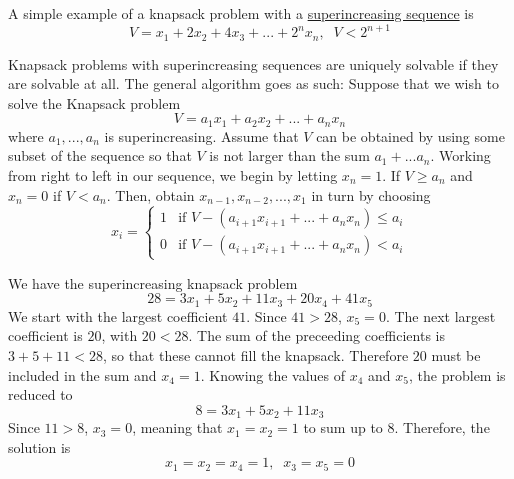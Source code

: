 \documentclass{article}
\newcounter{example}[section]
\begin{document}
A simple example of a knapsack problem with a \hyperref[def:superincreasing-sequence]{superincreasing sequence} is 
\begin{equation}
  V = x_1 + 2x_2 + 4x_3 + ... + 2^n x_n, \;\; V < 2^{n+1}
\end{equation}

Knapsack problems with superincreasing sequences are uniquely solvable if they are solvable at all. The general algorithm goes as such: Suppose that we wish to solve the Knapsack problem 
\begin{equation}
  V = a_1 x_1 + a_2 x_2 + ... + a_n x_n
\end{equation}
where $a_1, ..., a_n$ is superincreasing. Assume that $V$ can be obtained by using some subset of the sequence so that $V$ is not larger than the sum $a_1 + ... a_n$. Working from right to left in our sequence, we begin by letting $x_n = 1$. If $V \geq a_n$ and $x_n = 0$ if $V<a_n$. Then, obtain $x_{n-1}, x_{n-2}, ..., x_1$ in turn by choosing
\begin{equation}
  x_i = \begin{cases}
  1 & \text{if } V - (a_{i+1}x_{i+1} + ... + a_n x_n) \leq a_i \\
  0 & \text{if } V - (a_{i+1}x_{i+1} + ... + a_n x_n) < a_i
  \end{cases}
\end{equation}

\begin{example}
  \label{ex:solving-a-superincreasing-knapsack-problem}
We have the superincreasing knapsack problem
\begin{equation}
  28 = 3x_1 + 5x_2 + 11x_3 + 20x_4 + 41x_5
\end{equation}
We start with the largest coefficient $41$. Since $41>28$, $x_5 = 0$. The next largest coefficient is $20$, with $20<28$. The sum of the preceeding coefficients is $3+5+11<28$, so that these cannot fill the knapsack. Therefore $20$ must be included in the sum and $x_4 = 1$. Knowing the values of $x_4$ and $x_5$, the problem is reduced to 
\begin{equation}
  8 = 3x_1 + 5x_2 + 11x_3
\end{equation}
Since $11 > 8$, $x_3 = 0$, meaning that $x_1 = x_2 = 1$ to sum up to $8$. Therefore, the solution is 
\begin{equation}
  x_1 = x_2 = x_4 = 1, \;\; x_3 = x_5 = 0
\end{equation}
\end{example}
\end{document}
